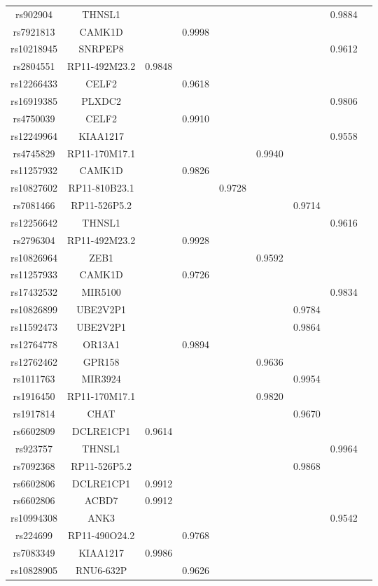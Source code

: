 \documentclass[12pt]{article}
\begin{document}
\begin{longtable}{ c c c c c c c c c}
rs902904&THNSL1&  &  & & &  &0.9884  \\
rs7921813&CAMK1D&  &0.9998  & & &  &  \\
rs10218945&SNRPEP8&  & & & &  &0.9612  \\
rs2804551&RP11-492M23.2&0.9848 & & & &  &  \\
rs12266433&CELF2& &0.9618 & & &  &  \\
rs16919385&PLXDC2& & & & &  &0.9806 \\
rs4750039&CELF2& &0.9910 & & &  &\\
rs12249964&KIAA1217& &  & & &  &0.9558 \\
rs4745829&RP11-170M17.1 &  & & &0.9940  & \\
rs11257932&CAMK1D &  &0.9826 & & & \\
rs10827602&RP11-810B23.1 &  &  &0.9728 & & \\
rs7081466&RP11-526P5.2&  & &  & & 0.9714& \\
rs12256642&THNSL1&  &  & & & &0.9616 \\
rs2796304&RP11-492M23.2&  &0.9928  & & &  \\
rs10826964&ZEB1&  & & &0.9592& & \\
rs11257933&CAMK1D&  &0.9726 & &  & & \\
rs17432532&MIR5100&  &  & &  & &0.9834 \\
rs10826899&UBE2V2P1&  &  & &  &0.9784 & \\
rs11592473&UBE2V2P1&  &  & &  &0.9864& \\
rs12764778&OR13A1&  &0.9894  & &  & & \\
rs12762462&GPR158&  &   & & 0.9636 & & \\
rs1011763&MIR3924&  &   & &  &0.9954 & \\
rs1916450&RP11-170M17.1&  &   & &0.9820 &  & \\
rs1917814&CHAT&  &   &  &   & 0.9670 & \\
rs6602809&DCLRE1CP1&0.9614  &   &  &   &   & \\
rs923757&THNSL1&   &   &  &   &   &0.9964 \\
rs7092368&RP11-526P5.2&   &   &  &   & 0.9868  & \\
rs6602806&DCLRE1CP1&0.9912   &   &  &   &    & \\
rs6602806&ACBD7&0.9912  &   &  &   &    & \\
rs10994308&ANK3&   &   &  &   &    &0.9542 \\
rs224699&RP11-490O24.2&   &0.9768   &  &   &    &  \\
rs7083349&KIAA1217&0.9986   &    &  &   &    &  \\
rs10828905&RNU6-632P&    &0.9626    &  &   &    &  \\


\end{longtable} 
\end{document}
